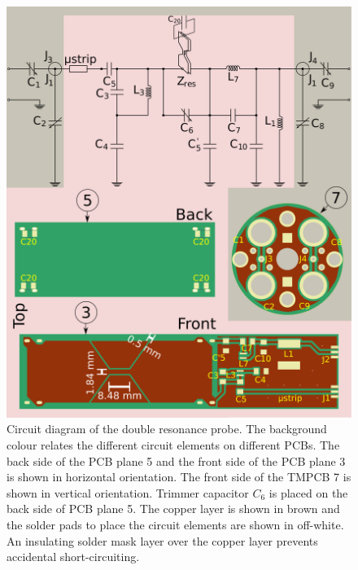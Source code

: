 \documentclass[preprint,5p]{elsarticle}
\begin{document}
\cbend
\cbstart
\begin{figure}
\centering
\includegraphics[width=\linewidth,keepaspectratio=true]{./figures/ms5n17-tlp-im-180110-circuit-diagram.png}
\caption{Circuit diagram of the double resonance probe. The background colour relates the different circuit elements on different PCBs. The back side of the PCB plane 5 and the front side of the PCB plane 3 is shown in horizontal orientation. The front side of the TMPCB 7 is shown in vertical orientation. Trimmer capacitor $C_6$ is placed on the back side of PCB plane 5. The copper layer is shown in brown and the solder pads to place the circuit elements are shown in off-white. An insulating solder mask layer over the copper layer prevents accidental short-circuiting.
}
\label{fig:circuit}
\end{figure}
\cbend
\end{document}
